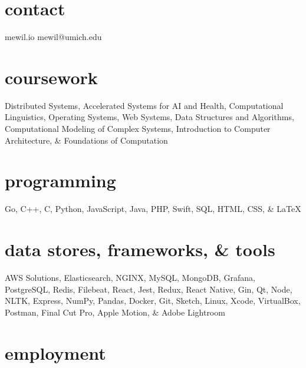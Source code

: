 \documentclass[]{template}
\begin{document}


\begin{aside}
\section{contact}
mewil.io
mewil@umich.edu
\section{coursework}
Distributed Systems, Accelerated Systems for AI and Health, Computational Linguistics, Operating Systems, Web Systems, Data Structures and Algorithms, Computational Modeling of Complex Systems, Introduction to Computer Architecture, \& Foundations of Computation
\section{programming}
Go, C++, C, Python, JavaScript, Java, PHP, Swift, SQL, HTML, CSS, \& LaTeX
\section{data stores, frameworks, \& tools}
AWS Solutions, Elasticsearch, NGINX, MySQL, MongoDB, Grafana, PostgreSQL, Redis, Filebeat, React, Jest, Redux, React Native, Gin, Qt, Node, NLTK, Express, NumPy, Pandas, Docker, Git, Sketch, Linux, Xcode, VirtualBox, Postman, Final Cut Pro, Apple Motion, \& Adobe Lightroom 
\end{aside}


\section{employment}
\end{document}
